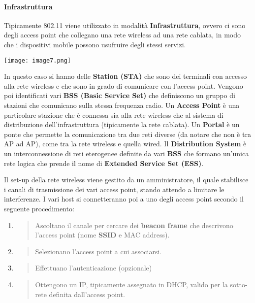 \paragraph{Infrastruttura }\label{infrastruttura}

Tipicamente 802.11 viene utilizzato in modalità \textbf{Infrastruttura},
ovvero ci sono degli access point che collegano una rete wireless ad una
rete cablata, in modo che i dispositivi mobile possono usufruire degli
stessi servizi.

\texttt{[image: image7.png]}

In questo caso si hanno delle \textbf{Station (STA)} che sono dei
terminali con accesso alla rete wireless e che sono in grado di
comunicare con l'access point. Vengono poi identificati vari \textbf{BSS
(Basic Service Set)} che definiscono un gruppo di stazioni che
comunicano sulla stessa frequenza radio. Un \textbf{Access Point} è una
particolare stazione che è connessa sia alla rete wireless che al
sistema di distribuzione dell'infrastruttura (tipicamente la rete
cablata). Un \textbf{Portal} è un ponte che permette la comunicazione
tra due reti diverse (da notare che non è tra AP ad AP), come tra la
rete wireless e quella wired. Il \textbf{Distribution System} è un
interconnessione di reti eterogenee definite da vari \textbf{BSS} che
formano un'unica rete logica che prende il nome di \textbf{Extended
Service Set (ESS)}.

Il set-up della rete wireless viene gestito da un amministratore, il
quale stabilisce i canali di trasmissione dei vari access point, stando
attendo a limitare le interferenze. I vari host si connetteranno poi a
uno degli access point secondo il seguente procedimento:

\begin{enumerate}
\def\labelenumi{\arabic{enumi}.}
\item
  \begin{quote}
  Ascoltano il canale per cercare dei \textbf{beacon frame} che
  descrivono l'access point (nome \textbf{SSID} e MAC address).
  \end{quote}
\item
  \begin{quote}
  Selezionano l'access point a cui associarsi.
  \end{quote}
\item
  \begin{quote}
  Effettuano l'autenticazione (opzionale)
  \end{quote}
\item
  \begin{quote}
  Ottengono un IP, tipicamente assegnato in DHCP, valido per la
  sotto-rete definita dall'access point.
  \end{quote}
\end{enumerate}

